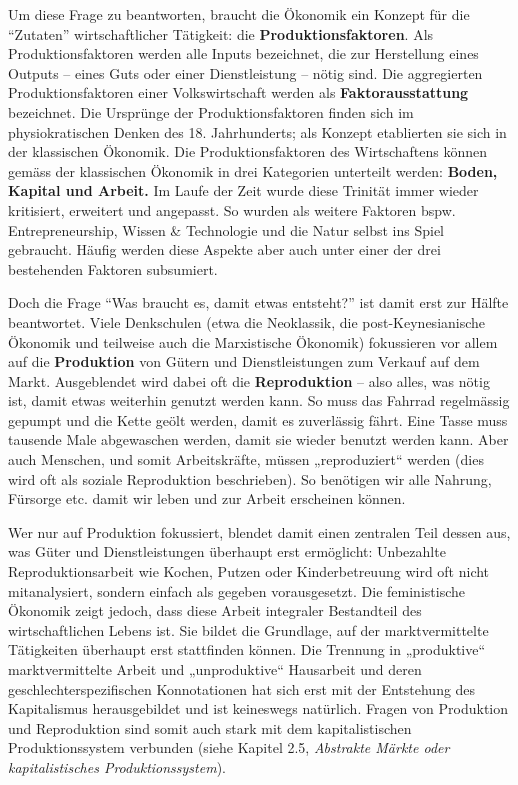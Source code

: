 \documentclass[
  nswissgerman,
  a4paper,
  DIV=11,
  numbers=noendperiod,
  oneside,
  openany]{scrreprt}
\begin{document}
Um diese Frage zu beantworten, braucht die Ökonomik ein Konzept für die
``Zutaten'' wirtschaftlicher Tätigkeit: die
\textbf{Produktionsfaktoren}. Als Produktionsfaktoren werden alle Inputs
bezeichnet, die zur Herstellung eines Outputs -- eines Guts oder einer
Dienstleistung -- nötig sind. Die aggregierten Produktionsfaktoren einer
Volkswirtschaft werden als \textbf{Faktorausstattung} bezeichnet. Die
Ursprünge der Produktionsfaktoren finden sich im physiokratischen Denken
des 18. Jahrhunderts; als Konzept etablierten sie sich in der
klassischen Ökonomik. Die Produktionsfaktoren des Wirtschaftens können
gemäss der klassischen Ökonomik in drei Kategorien unterteilt werden:
\textbf{Boden, Kapital und Arbeit.} Im Laufe der Zeit wurde diese
Trinität immer wieder kritisiert, erweitert und angepasst. So wurden als
weitere Faktoren bspw. Entrepreneurship, Wissen \& Technologie und die
Natur selbst ins Spiel gebraucht. Häufig werden diese Aspekte aber auch
unter einer der drei bestehenden Faktoren subsumiert.

Doch die Frage ``Was braucht es, damit etwas entsteht?'' ist damit erst
zur Hälfte beantwortet. Viele Denkschulen (etwa die Neoklassik, die
post-Keynesianische Ökonomik und teilweise auch die Marxistische
Ökonomik) fokussieren vor allem auf die \textbf{Produktion} von Gütern
und Dienstleistungen zum Verkauf auf dem Markt. Ausgeblendet wird dabei
oft die \textbf{Reproduktion} -- also alles, was nötig ist, damit etwas
weiterhin genutzt werden kann. So muss das Fahrrad regelmässig gepumpt
und die Kette geölt werden, damit es zuverlässig fährt. Eine Tasse muss
tausende Male abgewaschen werden, damit sie wieder benutzt werden kann.
Aber auch Menschen, und somit Arbeitskräfte, müssen „reproduziert``
werden (dies wird oft als soziale Reproduktion beschrieben). So
benötigen wir alle Nahrung, Fürsorge etc. damit wir leben und zur Arbeit
erscheinen können.

Wer nur auf Produktion fokussiert, blendet damit einen zentralen Teil
dessen aus, was Güter und Dienstleistungen überhaupt erst ermöglicht:
Unbezahlte Reproduktionsarbeit wie Kochen, Putzen oder Kinderbetreuung
wird oft nicht mitanalysiert, sondern einfach als gegeben vorausgesetzt.
Die feministische Ökonomik zeigt jedoch, dass diese Arbeit integraler
Bestandteil des wirtschaftlichen Lebens ist. Sie bildet die Grundlage,
auf der marktvermittelte Tätigkeiten überhaupt erst stattfinden können.
Die Trennung in „produktive`` marktvermittelte Arbeit und
„unproduktive`` Hausarbeit und deren geschlechterspezifischen
Konnotationen hat sich erst mit der Entstehung des Kapitalismus
herausgebildet und ist keineswegs natürlich. Fragen von Produktion und
Reproduktion sind somit auch stark mit dem kapitalistischen
Produktionssystem verbunden (siehe Kapitel 2.5, \emph{Abstrakte Märkte
oder kapitalistisches Produktionssystem}).
\end{document}
